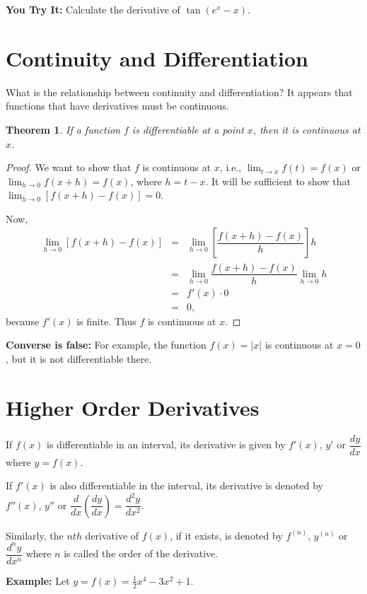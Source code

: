 \documentclass[titlepage,a4paper,12pt]{report}
\newtheorem{theorem}{Theorem}[section]
\begin{document}
\noindent \textbf{You Try It:} Calculate the derivative of $\tan (e^x-x)$.
\section{Continuity and Differentiation}
What is the relationship between continuity and differentiation? It appears that functions that have derivatives must be continuous.
\begin{theorem}
If a function  $f$ is differentiable at a point $x$, then it is continuous at $x$.
\end{theorem}
\begin{proof}
We want to show that $f$ is continuous at $x$, i.e., $\displaystyle \lim _{t\rightarrow x} f(t)=f(x)$ or $\displaystyle \lim _{h\rightarrow 0} f(x+h)=f(x)$, where $h=t-x$. It will be sufficient to show that $\displaystyle \lim _{h\rightarrow 0} [f(x+h)-f(x)]=0$.

\noindent Now, 
\begin{eqnarray*}
\lim _{h\rightarrow 0} [f(x+h)-f(x)] &=& \lim _{h\rightarrow 0} \left[\dfrac{f(x+h)-f(x)}{h}\right]h\\
&=& \lim _{h\rightarrow 0} \dfrac{f(x+h)-f(x)}{h} \lim _{h\rightarrow 0} h \\
&=& f'(x)\cdot 0 \\
&=& 0, 
\end{eqnarray*}
because $f'(x)$ is finite. Thus $f$ is continuous at $x$.
\end{proof}
\noindent \textbf{Converse is false:} For example, the function $f(x)=|x|$ is continuous at $x=0$, but it is not differentiable there. 

\section{Higher Order Derivatives}
If $f(x)$ is differentiable in an interval, its derivative is given by $f'(x), \, y'$ or $\dfrac{dy}{dx}$ where $y=f(x)$.

\noindent If $f'(x)$ is also differentiable in the interval, its derivative is denoted by $f''(x), \, y''$ or $\dfrac{d}{dx}\left(\dfrac{dy}{dx}\right)=\dfrac{d^2y}{dx^2}$.

\noindent Similarly, the $nth$ derivative of $f(x)$, if it exists, is denoted by $f^{(n)}, \, y^{(n)}$ or $\dfrac{d^ny}{dx^n}$ where $n$ is called the order of the derivative.

\noindent \textbf{Example:} Let $y=f(x)=\frac{1}{2}x^4-3x^2+1$.
\end{document}
